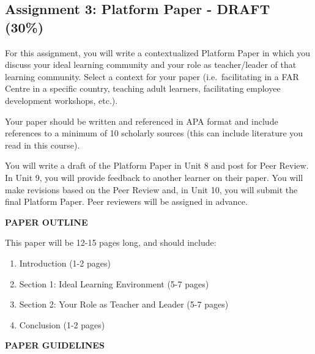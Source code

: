 \documentclass[
]{book}
\providecommand{\tightlist}{%
  \setlength{\itemsep}{0pt}\setlength{\parskip}{0pt}}
\begin{document}
\begin{assessment}
\hypertarget{assignment-3-platform-paper---draft-30}{%
\subsection*{Assignment 3: Platform Paper - DRAFT
(30\%)}\label{assignment-3-platform-paper---draft-30}}

For this assignment, you will write a contextualized Platform Paper in
which you discuss your ideal learning community and your role as
teacher/leader of that learning community. Select a context for your
paper (i.e.~facilitating in a FAR Centre in a specific country, teaching
adult learners, facilitating employee development workshops, etc.).

Your paper should be written and referenced in APA format and include
references to a minimum of 10 scholarly sources (this can include
literature you read in this course).

You will write a draft of the Platform Paper in Unit 8 and post for Peer
Review. In Unit 9, you will provide feedback to another learner on their
paper. You will make revisions based on the Peer Review and, in Unit 10,
you will submit the final Platform Paper. Peer reviewers will be
assigned in advance.

\textbf{PAPER OUTLINE}

This paper will be 12-15 pages long, and should include:

\begin{enumerate}
\def\labelenumi{\arabic{enumi}.}
\tightlist
\item
  Introduction (1-2 pages)
\item
  Section 1: Ideal Learning Environment (5-7 pages)
\item
  Section 2: Your Role as Teacher and Leader (5-7 pages)
\item
  Conclusion (1-2 pages)
\end{enumerate}

\textbf{PAPER GUIDELINES}


\end{assessment}
\end{document}
